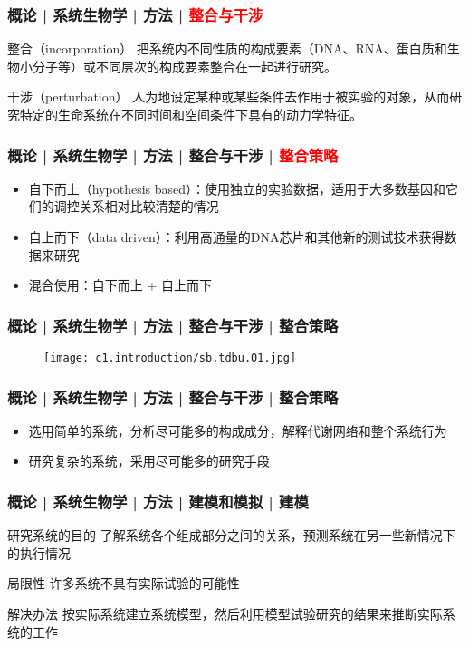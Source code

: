 \begin{frame}
  \frametitle{概论 | 系统生物学 | 方法 | \textcolor{red}{整合与干涉}}
  \begin{block}{整合（incorporation）}
把系统内不同性质的构成要素（DNA、RNA、蛋白质和生物小分子等）或不同层次的构成要素整合在一起进行研究。
  \end{block}
  \pause
  \begin{block}{干涉（perturbation）}
人为地设定某种或某些条件去作用于被实验的对象，从而研究特定的生命系统在不同时间和空间条件下具有的动力学特征。 \end{block}
\end{frame}

\begin{frame}
  \frametitle{概论 | 系统生物学 | 方法 | 整合与干涉 | \textcolor{red}{整合策略}}
  \begin{itemize}
    \item 自下而上（hypothesis based）：使用独立的实验数据，适用于大多数基因和它们的调控关系相对比较清楚的情况
    \item 自上而下（data driven）：利用高通量的DNA芯片和其他新的测试技术获得数据来研究
    \item 混合使用：自下而上 + 自上而下
  \end{itemize}
\end{frame}

\begin{frame}
  \frametitle{概论 | 系统生物学 | 方法 | 整合与干涉 | 整合策略}
  \begin{figure}
    \centering
    \texttt{[image: c1.introduction/sb.tdbu.01.jpg]}
  \end{figure}
\end{frame}

\begin{frame}
  \frametitle{概论 | 系统生物学 | 方法 | 整合与干涉 | 整合策略}
  \begin{itemize}
    \item 选用简单的系统，分析尽可能多的构成成分，解释代谢网络和整个系统行为
    \item 研究复杂的系统，采用尽可能多的研究手段
  \end{itemize}
\end{frame}

\begin{frame}
  \frametitle{概论 | 系统生物学 | 方法 | 建模和模拟 | 建模}
  \begin{block}{研究系统的目的}
了解系统各个组成部分之间的关系，预测系统在另一些新情况下的执行情况
  \end{block}
  \pause
  \begin{block}{局限性}
许多系统不具有实际试验的可能性
  \end{block}
  \pause
  \begin{block}{解决办法}
按实际系统建立系统模型，然后利用模型试验研究的结果来推断实际系统的工作
  \end{block}
\end{frame}

